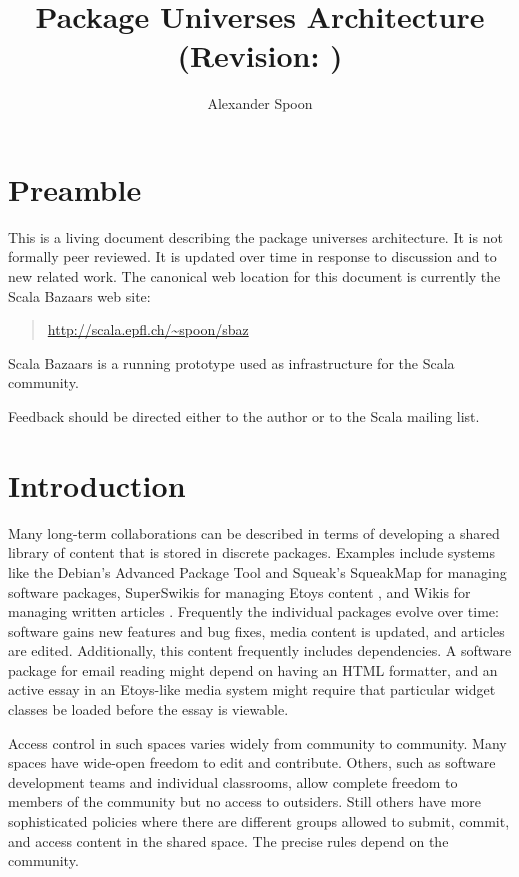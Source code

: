 \documentclass{article}
\begin{document}

\title{Package Universes Architecture\\
(Revision: )}
\author{Alexander Spoon}
\date{}
\maketitle

\section{Preamble}
This is a living document describing the package universes
architecture.  It is not formally peer reviewed.  It is updated over
time in response to discussion and to new related work.
The canonical web location for this document is currently the Scala
Bazaars web site:
\begin{quote}
  \url{http://scala.epfl.ch/~spoon/sbaz}
\end{quote}
Scala Bazaars
is a running prototype used as infrastructure for the
Scala
community.

Feedback should be directed either to the author or to the Scala
mailing list.


\section{Introduction}
Many long-term collaborations can be described in terms of developing
a shared library of content that is stored in discrete packages.  
Examples include systems like the Debian's Advanced Package Tool and
Squeak's SqueakMap for managing software packages, SuperSwikis for
managing Etoys content \cite{steinmetz02:learning}, and Wikis for
managing written articles \cite{ward01:wikiway}.  Frequently the
individual packages evolve over time: software gains new features and
bug fixes, media content is updated, and articles are edited.
Additionally, this content frequently includes dependencies.  A
software package for email reading might depend on having an HTML
formatter, and an active essay in an Etoys-like media system might
require that particular widget classes be loaded before the essay is
viewable.

Access control in such spaces varies widely from community to
community.  Many spaces have wide-open freedom to edit and contribute.
Others, such as software development teams and individual classrooms,
allow complete freedom to members of the community but no access to
outsiders.  Still others have more sophisticated policies where there
are different groups allowed to submit, commit, and access content in
the shared space.  The precise rules depend on the community.
\end{document}
